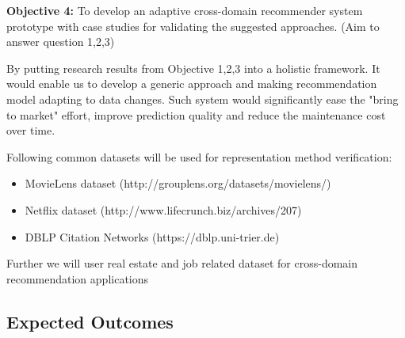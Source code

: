 \bigskip
\textbf{Objective 4:} To develop an adaptive cross-domain recommender system prototype with case studies for validating the suggested approaches. (Aim to answer question 1,2,3)

By putting research results from Objective 1,2,3 into a holistic framework. It would enable us to develop a generic approach and making recommendation model adapting to data changes. Such system would significantly ease the "bring to market" effort, improve prediction quality and reduce the maintenance cost over time. 

Following common datasets will be used for representation method verification: 

\begin{itemize}

\item MovieLens dataset (http://grouplens.org/datasets/movielens/) 

\item Netflix dataset (http://www.lifecrunch.biz/archives/207) 

\item DBLP Citation Networks (https://dblp.uni-trier.de)  

\end{itemize}

Further we will user real estate and job related dataset for cross-domain recommendation applications


\subsection{Expected Outcomes}

